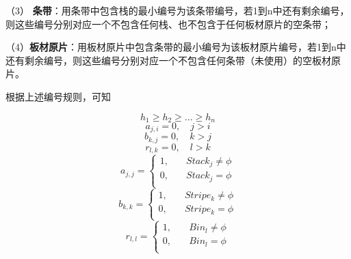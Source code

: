 \documentclass[bwprint]{gmcmthesis}
\begin{document}
（3） \textbf{条带}：用条带中包含栈的最小编号为该条带编号，若1到n中还有剩余编号，则这些编号分别对应一个不包含任何栈、也不包含于任何板材原片的空条带；

（4）\textbf{板材原片}：用板材原片中包含条带的最小编号为该板材原片编号，若1到n中还有剩余编号，则这些编号分别对应一个不包含任何条带（未使用）的空板材原片。

根据上述编号规则，可知

\begin{equation}
    h_{1} \ge h_{2} \ge ... \ge h_{n}
\end{equation} 
\begin{equation}
    a_{j,i}=0, \quad   j>i
\end{equation}
\begin{equation}
    b_{k,j}=0, \quad   k>j
\end{equation}
\begin{equation}
    r_{l,k}=0, \quad   l>k
\end{equation}
\begin{equation}
    a_{j,j}=
    \begin{cases}
        1, \quad  & Stack_j \neq  \phi  \\
        0,\quad  & Stack_j  =  \phi  \\
    \end{cases}
\end{equation}
\begin{equation}
    b_{k,k}=
    \begin{cases}
        1, \quad  & Stripe_k \neq  \phi  \\
        0,\quad  & Stripe_k =  \phi  \\
    \end{cases}
\end{equation}
\begin{equation}
    r_{l,l}=
    \begin{cases}
        1, \quad  & Bin_l \neq  \phi  \\
        0,\quad  & Bin_l = \phi  \\
    \end{cases}
\end{equation}
\end{document}
